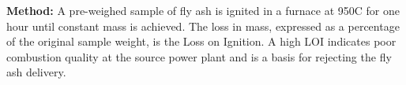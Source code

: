 \par\noindent
\textbf{Method:} A pre-weighed sample of fly ash is ignited in a furnace at 950\textdegree C for one hour until constant mass is achieved. The loss in mass, expressed as a percentage of the original sample weight, is the Loss on Ignition. A high LOI indicates poor combustion quality at the source power plant and is a basis for rejecting the fly ash delivery.